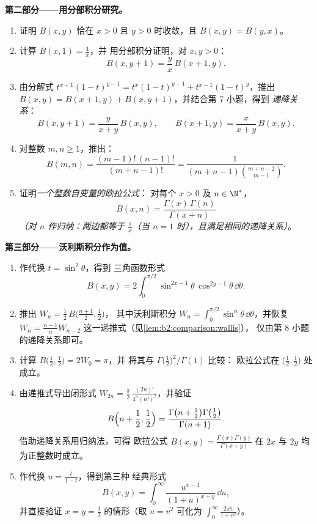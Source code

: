 \begin{problem}
\medskip
\noindent\textbf{第二部分——用分部积分研究。}
\begin{enumerate}[resume]
  \item 证明 $B(x,y)$ 恰在 $x > 0$ 且 $y >
        0$ 时收敛，且 $B(x,y) = B(y,x)$。
  \item 计算 $B(x, 1) = \frac1x$，并
        用分部积分证明，对 $x, y > 0$：
        \[
        B(x, y+1) = \frac{y}{x}\,B(x+1, y) .
        \]
  \item 由分解式 $t^{x-1}(1-t)^{y-1} =
        t^{x}(1-t)^{y-1} + t^{x-1}(1-t)^{y}$，推出 $B(x,y) =
        B(x+1,y) + B(x,y+1)$，并结合第 7 小题，得到
        \emph{递降关系}：
        \[
        B(x, y+1) = \frac{y}{x+y}\,B(x,y),
        \qquad
        B(x+1, y) = \frac{x}{x+y}\,B(x,y) .
        \]
  \item 对整数 $m, n \geq 1$，推出：
        \[
        B(m, n) = \frac{(m-1)!\,(n-1)!}{(m+n-1)!}
        = \frac{1}{(m+n-1)\binom{m+n-2}{m-1}} .
        \]
  \item 证明\emph{一个整数自变量的欧拉公式}：
        对每个 $x > 0$ 及 $n \in \N^*$，
        \[
        B(x, n) = \frac{\Gamma(x)\,\Gamma(n)}{\Gamma(x + n)}
        \]
        \emph{（对 $n$ 作归纳：两边都等于 $\frac1x$（当 $n
        = 1$ 时），且满足相同的递降关系）}。
\end{enumerate}

\medskip
\noindent\textbf{第三部分——沃利斯积分作为值。}
\begin{enumerate}[resume]
  \item 作代换 $t = \sin^2\theta$，得到
        三角函数形式
        \[
        B(x, y) = 2\int_0^{\pi/2}
        \sin^{2x-1}\theta\,\cos^{2y-1}\theta\,\dd\theta .
        \]
  \item 推出 $W_n = \frac12\,B\bigl(\frac{n+1}2, \frac12\bigr)$，
        其中沃利斯积分 $W_n = \int_0^{\pi/2}\sin^n
        \theta\,\dd\theta$，并恢复 $W_n =
        \frac{n-1}{n}W_{n-2}$ 这一递推式（见\cref{lem:b2:comparison:wallis}），
        仅由第 8 小题的递降关系即可。
  \item 计算 $B\bigl(\frac12, \frac12\bigr) = 2W_0 = \pi$，并
        将其与 $\Gamma\bigl(\frac12\bigr)^2/\Gamma(1)$ 比较：
        欧拉公式在 $\bigl(\frac12,
        \frac12\bigr)$ 处成立。
  \item 由递推式导出闭形式 $W_{2n} = \frac\pi2\,
        \frac{(2n)!}{4^n(n!)^2}$，并验证
        \[
        B\Bigl(n + \frac12, \frac12\Bigr)
        = \frac{\Gamma\bigl(n + \frac12\bigr)\Gamma\bigl(
        \frac12\bigr)}{\Gamma(n+1)} .
        \]
        借助递降关系用归纳法，可得
        欧拉公式 $B(x,y) =
        \frac{\Gamma(x)\Gamma(y)}{\Gamma(x+y)}$ 在
        $2x$ 与 $2y$ 均为正整数时成立。
  \item 作代换 $u = \frac{t}{1-t}$，得到第三种
        经典形式
        \[
        B(x,y) = \int_0^\infty
        \frac{u^{x-1}}{(1+u)^{x+y}}\,\dd u ,
        \]
        并直接验证 $x = y = \frac12$ 的情形（取 $u = v^2$
        可化为 $\int_0^\infty\frac{2\,\dd v}{1+v^2}$）。
\end{enumerate}


\end{problem}
